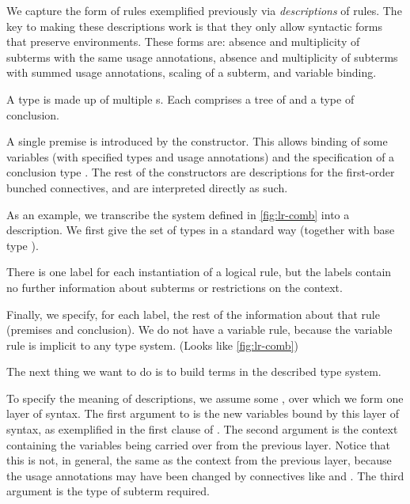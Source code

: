 We capture the form of rules exemplified previously via
\emph{descriptions} of rules.
The key to making these descriptions work is that they only allow syntactic
forms that preserve environments.
These forms are: absence and multiplicity of subterms with the same usage
annotations, absence and multiplicity of subterms with summed usage annotations,
scaling of a subterm, and variable binding.

A type  is made up of multiple s.
Each  comprises a tree of  and a type
of conclusion.

A single premise is introduced by the
 constructor.
This allows binding of some variables \AgdaBound{$\Delta$} (with specified
types and usage annotations) and the specification of a conclusion type
.
The rest of the constructors are descriptions for the first-order bunched
connectives, and are interpreted directly as such.


As an example, we transcribe the system defined in \cref{fig:lr-comb} into a
description.
We first give the set of types in a standard way (together with base type
\AgdaInductiveConstructor{$\iota$}).


There is one label for each instantiation of a logical rule, but the labels
contain no further information about subterms or restrictions on the context.


Finally, we specify, for each label, the rest of the information about that
rule {\color{red}(premises and conclusion)}.
We do not have a variable rule, because the variable rule is implicit to any
type system.
{\color{red}(Looks like \cref{fig:lr-comb})}


The next thing we want to do is to build terms in the described type system.


To specify the meaning of descriptions, we assume some
, over which we form one layer of syntax.
The first argument to  is the new variables bound by this layer
of syntax, as exemplified in the first clause of
.
The second argument is the context containing the variables being carried over
from the previous layer.
Notice that this is not, in general, the same as the context from the previous
layer, because the usage annotations may have been changed by connectives like
 and .
The third argument is the type of subterm required.

